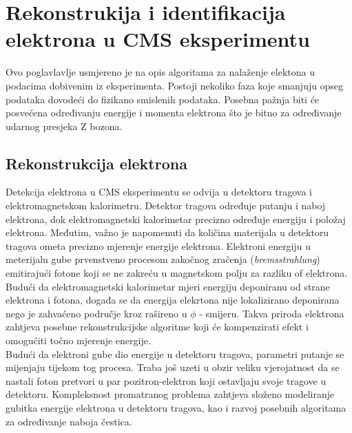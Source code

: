 \documentclass[a4paper,12pt]{report}
\begin{document}
\chapter{Rekonstrukija i identifikacija elektrona u CMS eksperimentu}
\label{ch:rekonstrukcija}
Ovo poglavlavlje usmjereno je na opis algoritama za nalaženje elektona u podacima dobivenim iz eksperimenta. Postoji nekoliko faza koje smanjuju opseg podataka dovodeći do fizikano smislenih podataka.  Posebna pažnja biti će posvećena određivanju energije i momenta elektrona što je bitno za određivanje udarnog presjeka Z bozona.

\section{Rekonstrukcija elektrona}

Detekcija elektrona u CMS eksperimentu se odvija u detektoru tragova i elektromagnetskom kalorimetru. Detektor tragova određuje putanju i naboj elektrona, dok elektromagnetski kalorimetar precizno određuje energiju i položaj elektrona. Međutim, važno je napomenuti da količina materijala u detektoru tragova ometa precizno mjerenje energije elektrona. Elektroni energiju u meterijalu gube prvenstveno procesom zakočnog zračenja (\textit{bremsstrahlung}) emitirajući fotone koji se ne zakreću u magnetskom polju za razliku of elektrona. Budući da elektromagnetski kalorimetar mjeri energiju deponiranu od strane elektrona i fotona, događa se da energija elekrtona nije lokalizirano deponirana nego je zahvaćeno područje kroz rašireno u $\phi$ - smijeru. Takva priroda elektrona zahtjeva posebne rekonstrukcijske algoritme koji će kompenzirati efekt i omogućiti točno mjerenje energije. \\
Budući da elektroni gube dio energije u detektoru tragova, parametri putanje se mijenjaju tijekom tog procesa. Traba još  uzeti u obzir veliku vjerojatnost da se nastali foton pretvori u par pozitron-elektron koji ostavljaju svoje tragove u detektoru. Kompleksnost promatranog problema zahtjeva složeno modeliranje gubitka energije elektrona u detektoru tragova, kao i razvoj posebnih algoritama za određivanje naboja čestica.\\
\end{document}
